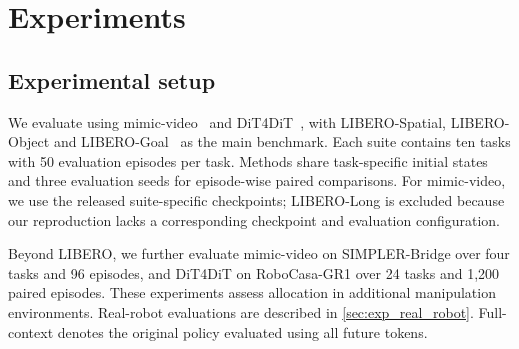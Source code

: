 \section{Experiments}
\label{sec:exp}




\subsection{Experimental setup}
\label{sec:exp_setup}

We evaluate \method using mimic-video~\cite{pai2025mimicvideo} and DiT4DiT~\cite{ma2026dit4dit}, with LIBERO-Spatial, LIBERO-Object and LIBERO-Goal~\cite{liu2023libero} as the main benchmark.
Each suite contains ten tasks with 50 evaluation episodes per task.
Methods share task-specific initial states and three evaluation seeds for episode-wise paired comparisons.
For mimic-video, we use the released suite-specific checkpoints; LIBERO-Long is excluded because our reproduction lacks a corresponding checkpoint and evaluation configuration.



Beyond LIBERO, we further evaluate mimic-video on SIMPLER-Bridge over four tasks and 96 episodes, and DiT4DiT on RoboCasa-GR1 over 24 tasks and 1,200 paired episodes.
These experiments assess allocation in additional manipulation environments.
Real-robot evaluations are described in \cref{sec:exp_real_robot}.
Full-context denotes the original policy evaluated using all future tokens.



